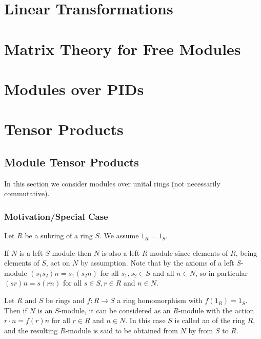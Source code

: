 \documentclass[12pt, a4paper, twoside, openright, titlepage]{book}
\begin{document}
\chapter{\textsection\textsection Linear Transformations}


\chapter{\textsection\textsection Matrix Theory for Free Modules}



\chapter{\textsection\textsection Modules over PIDs}


\chapter{\textsection\textsection Tensor Products}


\section{\textsection Module Tensor Products}

In this section we consider modules over unital rings (not necessarily commutative).

\subsection{Motivation/Special Case}

Let $R$ be a subring of a ring $S$. We assume $1_R = 1_S$.

If $N$ is a left $S$-module then $N$ is also a left $R$-module since elements of $R$, being elements of $S$, act on $N$ by assumption. Note that by the axioms of a left $S$-module $(s_1s_2)n = s_1(s_2n)$ for all $s_1,s_2 \in S$ and all $n \in N$, so in particular $(sr)n = s(rn)$ for all $s \in S, r \in R$ and $n \in N$.

\begin{defn}{}{}
    Let $R$ and $S$ be rings and $f:R\rightarrow S$ a ring homomorphism with $f(1_R) = 1_S$. Then if $N$ is an $S$-module, it can be considered as an $R$-module with the action $r\cdot n = f(r)n$ for all $r \in R$ and $n\in N$. In this case $S$ is called an  of the ring $R$, and the resulting $R$-module is said to be obtained from $N$ by  from $S$ to $R$.
\end{defn}
\end{document}
